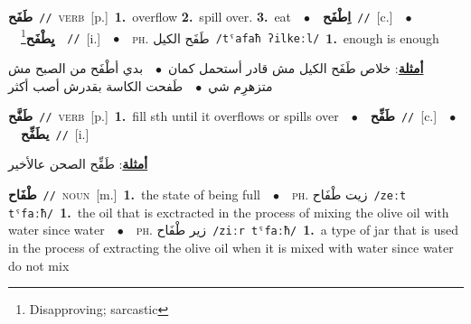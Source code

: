 \documentclass[10pt,a4paper,twoside]{article} %
\begin{document}
\begin{multicols}{2}
{\setlength\topsep{0pt}\textbf{\foreignlanguage{arabic}{طَفَح}}\ {\color{gray}\texttt{//}\color{black}}\ \textsc{verb}\ [p.]\ \textbf{1.}~overflow  \textbf{2.}~spill over.  \textbf{3.}~eat\ \ $\bullet$\ \ \setlength\topsep{0pt}\textbf{\foreignlanguage{arabic}{اِطْفَح}}\ {\color{gray}\texttt{//}\color{black}}\ [c.]\ \ $\bullet$\ \ \setlength\topsep{0pt}\textbf{\foreignlanguage{arabic}{يِطْفَح}}\footnote{Disapproving; sarcastic}\ \ {\color{gray}\texttt{//}\color{black}}\ [i.]\ \ $\bullet$\ \ \textsc{ph.} \color{gray} \foreignlanguage{arabic}{طَفَح الكيل}\color{black}\ {\color{gray}\texttt{/{\sffamily tˤafaħ ʔilkeːl}/}\color{black}}\ \textbf{1.}~enough is enough\  \begin{flushright}\color{gray}\foreignlanguage{arabic}{\textbf{\underline{\foreignlanguage{arabic}{أمثلة}}}: خلاص طَفَح الكيل مش قادر أستحمل كمان\ $\bullet$\ \  بدي أطْفَح من الصبح مش متزهرِم شي\ $\bullet$\ \  طَفحت الكاسة بقدرش أصب أكثر}\end{flushright}\color{black}} \vspace{2mm}

{\setlength\topsep{0pt}\textbf{\foreignlanguage{arabic}{طَفَّح}}\ {\color{gray}\texttt{//}\color{black}}\ \textsc{verb}\ [p.]\ \textbf{1.}~fill sth until it overflows or spills over\ \ $\bullet$\ \ \setlength\topsep{0pt}\textbf{\foreignlanguage{arabic}{طَفِّح}}\ {\color{gray}\texttt{//}\color{black}}\ [c.]\ \ $\bullet$\ \ \setlength\topsep{0pt}\textbf{\foreignlanguage{arabic}{يطَفِّح}}\ {\color{gray}\texttt{//}\color{black}}\ [i.]\  \begin{flushright}\color{gray}\foreignlanguage{arabic}{\textbf{\underline{\foreignlanguage{arabic}{أمثلة}}}: طَفِّح الصحن عالأخير}\end{flushright}\color{black}} \vspace{2mm}

{\setlength\topsep{0pt}\textbf{\foreignlanguage{arabic}{طْفَاح}}\ {\color{gray}\texttt{//}\color{black}}\ \textsc{noun}\ [m.]\ \textbf{1.}~the state of being full\ \ $\bullet$\ \ \textsc{ph.} \color{gray} \foreignlanguage{arabic}{زيت طْفَاح}\color{black}\ {\color{gray}\texttt{/{\sffamily zeːt tˤfaːħ}/}\color{black}}\ \textbf{1.}~the oil that is exctracted in the process of mixing the olive oil  with water since water\ \ $\bullet$\ \ \textsc{ph.} \color{gray} \foreignlanguage{arabic}{زير طْفَاح}\color{black}\ {\color{gray}\texttt{/{\sffamily ziːr tˤfaːħ}/}\color{black}}\ \textbf{1.}~a type of jar that is used in the process of extracting the olive oil when it is mixed with water since water do not mix\ } \vspace{2mm}


\end{multicols}
\end{document}
